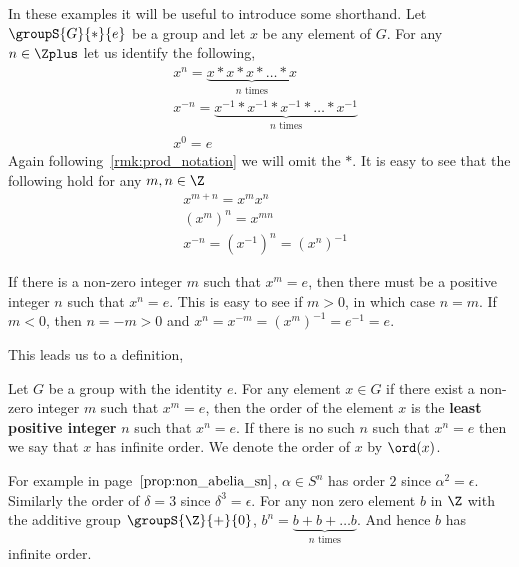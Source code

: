 In these examples it will be useful to introduce some shorthand. Let $\groupS{G}{\ast}{e}$ 
be a group and let $x$ be any
element of $G$. For any $n \in \Zplus$ let us identify the following,
\begin{align*}
    &x^n = \underbrace{x{\ast}x{\ast}x\ast \ldots \ast x}_\text{$n$ times}\\ 
    &x^{-n} = \underbrace{x^{-1}{\ast}x^{-1}{\ast}x^{-1}\ast \ldots \ast x^{-1}}_\text{$n$ times}\\ 
    &x^0 = e
\end{align*}
Again following~\ref{rmk:prod_notation} we will omit the $\ast$. 
It is easy to see that the following hold for any $m,n\in \Z$
\begin{align*}
    &x^{m+n} = x^{m}x^{n}\\
    &{(x^{m})}^n = x^{mn}\\
    &x^{-n} = {(x^{-1})}^n = {(x^{n})}^{-1}
\end{align*}
\begin{Observation}
    If there is a non-zero integer $m$ such that $x^{m} = e$, then there must be a positive integer $n$ such
    that $x^n = e$. This is easy to see if $m > 0$, in which case $n = m$. If $m < 0$, then $n = -m > 0$ and
    $x^{n} = x^{-m} =  {(x^{m})}^{-1} = e^{-1} = e$.
\end{Observation}
This leads us to a definition,
\begin{Definition}[name=Order of an element]
    Let $G$ be a group with the identity $e$. For any element $x \in G$ if there exist a non-zero 
    integer $m$ such that $x^{m} = e$, then the order of the element $x$ is the
    \textbf{least positive integer} $n$ such that $x^{n} = e$. If there is no such $n$ such that $x^n = e$
    then we say that $x$ has infinite order. We denote the order of $x$ by $\ord(x)$.
\end{Definition}
For example in page~$\pageref{prop:non_abelia_sn}$, $\alpha \in S^n$ has order $2$ since $\alpha^{2} = \epsilon$.
Similarly the order of $\delta = 3$ since $\delta^{3} = \epsilon$. For any non zero element $b$ in $\Z$ with
the additive group $\groupS{\Z}{+}{0}$, $b^n = \underbrace{b + b + \ldots b}_\text{$n$ times}$. And hence $b$
has infinite order.

